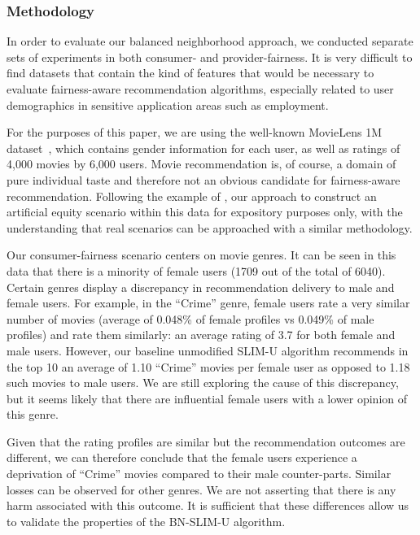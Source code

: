 \subsubsection{\textbf{Methodology}}
\hfill

In order to evaluate our balanced neighborhood approach, we conducted separate sets of experiments in both consumer- and provider-fairness. It is very difficult to find datasets that contain the kind of features that would be necessary to evaluate fairness-aware recommendation algorithms, especially related to user demographics in sensitive application areas such as employment. 

For the purposes of this paper, we are using the well-known MovieLens 1M dataset~\cite{movielens}, which contains gender information for each user, as well as ratings of 4,000 movies by 6,000 users. Movie recommendation is, of course, a domain of pure individual taste and therefore not an obvious candidate for fairness-aware recommendation. Following the example of \cite{yao2017beyond}, our approach to construct an artificial equity scenario within this data for expository purposes only, with the understanding that real scenarios can be approached with a similar methodology. 

Our consumer-fairness scenario centers on movie genres. It can be seen in this data that there is a minority of female users (1709 out of the total of 6040). Certain genres display a discrepancy in recommendation delivery to male and female users. For example, in the ``Crime'' genre, female users rate a very similar number of movies (average of 0.048\% of female profiles vs 0.049\% of male profiles) and rate them similarly: an average rating of 3.7 for both female and male users. However, our baseline unmodified SLIM-U algorithm recommends in the top 10 an average of 1.10 ``Crime'' movies per female user as opposed to 1.18 such movies to male users. We are still exploring the cause of this discrepancy, but it seems likely that there are influential female users with a lower opinion of this genre. 

Given that the rating profiles are similar but the recommendation outcomes are different, we can therefore conclude that the female users experience a deprivation of ``Crime'' movies compared to their male counter-parts. Similar losses can be observed for other genres. We are not asserting that there is any harm associated with this outcome. It is sufficient that these differences allow us to validate the properties of the BN-SLIM-U algorithm.

